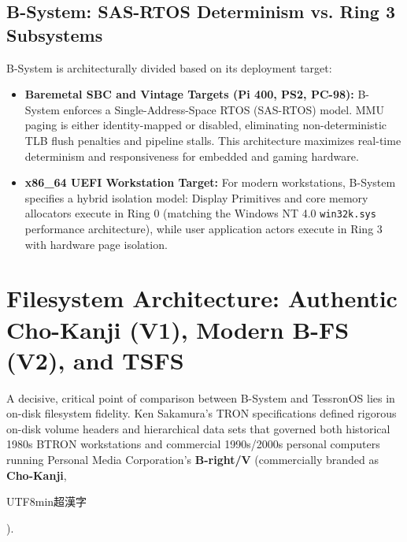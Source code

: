 \documentclass[10pt,journal,compsoc,twocolumn]{article}
\newcommand{\ja}[1]{\begin{CJK*}{UTF8}{min}#1\end{CJK*}}
\begin{document}
\subsection{B-System: SAS-RTOS Determinism vs. Ring 3 Subsystems}
B-System is architecturally divided based on its deployment target:
\begin{itemize}[leftmargin=*]
    \item \textbf{Baremetal SBC and Vintage Targets (Pi 400, PS2, PC-98):} B-System enforces a Single-Address-Space RTOS (SAS-RTOS) model. MMU paging is either identity-mapped or disabled, eliminating non-deterministic TLB flush penalties and pipeline stalls. This architecture maximizes real-time determinism and responsiveness for embedded and gaming hardware.
    \item \textbf{x86\_64 UEFI Workstation Target:} For modern workstations, B-System specifies a hybrid isolation model: Display Primitives and core memory allocators execute in Ring 0 (matching the Windows NT 4.0 \texttt{win32k.sys} performance architecture), while user application actors execute in Ring 3 with hardware page isolation.
\end{itemize}

\section{Filesystem Architecture: Authentic Cho-Kanji (V1), Modern B-FS (V2), and TSFS}
\label{sec:fs}

A decisive, critical point of comparison between B-System and TessronOS lies in on-disk filesystem fidelity. Ken Sakamura's TRON specifications defined rigorous on-disk volume headers and hierarchical data sets that governed both historical 1980s BTRON workstations and commercial 1990s/2000s personal computers running Personal Media Corporation's \textbf{B-right/V} (commercially branded as \textbf{Cho-Kanji}, \ja{超漢字}).
\end{document}
